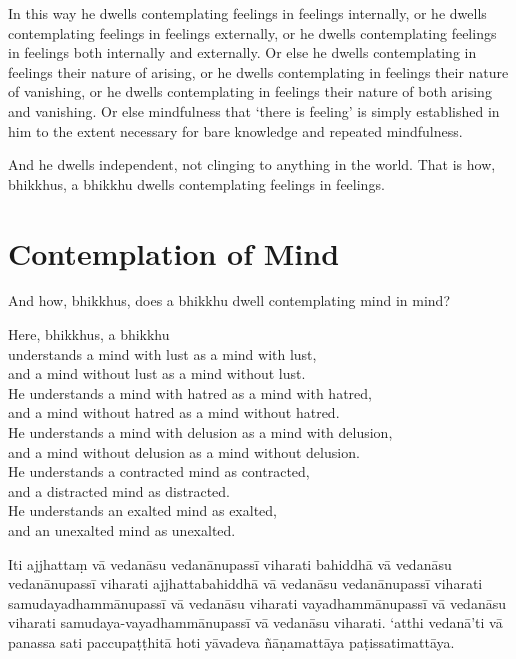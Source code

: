 In this way he dwells contemplating feelings in feelings internally, or he
dwells contemplating feelings in feelings externally, or he dwells contemplating
feelings in feelings both internally and externally. Or else he dwells
contemplating in feelings their nature of arising, or he dwells contemplating in
feelings their nature of vanishing, or he dwells contemplating in feelings their
nature of both arising and vanishing. Or else mindfulness that ‘there is
feeling’ is simply established in him to the extent necessary for bare knowledge
and repeated mindfulness.

And he dwells independent, not clinging to anything in the world. That is how,
bhikkhus, a bhikkhu dwells contemplating feelings in feelings.


\chapter{Contemplation of Mind}

And how, bhikkhus, does a bhikkhu dwell contemplating mind in mind?

Here, bhikkhus, a bhikkhu\\
understands a mind with lust as a mind with lust,\\
and a mind without lust as a mind without lust.\\
He understands a mind with hatred as a mind with hatred,\\
and a mind without hatred as a mind without hatred.\\
He understands a mind with delusion as a mind with delusion,\\
and a mind without delusion as a mind without delusion.\\
He understands a contracted mind as contracted,\\
and a distracted mind as distracted.\\
He understands an exalted mind as exalted,\\
and an unexalted mind as unexalted.

\paliPage

Iti ajjhattaṃ vā vedanāsu vedanānupassī viharati bahiddhā vā vedanāsu
vedanānupassī viharati ajjhattabahiddhā vā vedanāsu vedanānupassī viharati
samudayadhammānupassī vā vedanāsu viharati vayadhammānupassī vā vedanāsu
viharati samudaya-vayadhammānupassī vā vedanāsu viharati. `atthi vedanā'ti vā
panassa sati paccupaṭṭhitā hoti yāvadeva ñāṇamattāya paṭissatimattāya.

